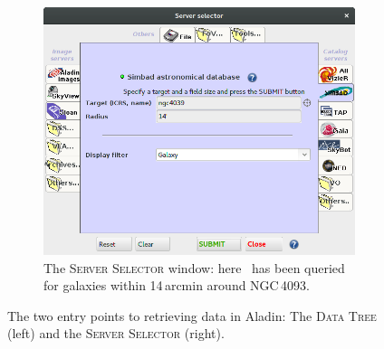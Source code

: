 \documentclass [a4paper, 12pt]{article}
\begin{document}
\begin{figure}[H]
\begin{subfigure}[H]{0.4\textwidth}
        \includegraphics[width=1
        \textwidth]{../images/aladin_server_selector.png}
        \caption{The \textsc{Server Selector} window: here \simbad\ has been
        queried for galaxies within 14\,arcmin around NGC\,4093.}
        \label{fig:server_selector}
    \end{subfigure}
    \caption{The two entry points to retrieving data in Aladin: The
    \textsc{Data Tree} (left) and the \textsc{Server Selector} (right).}
\end{figure}
\end{document}
